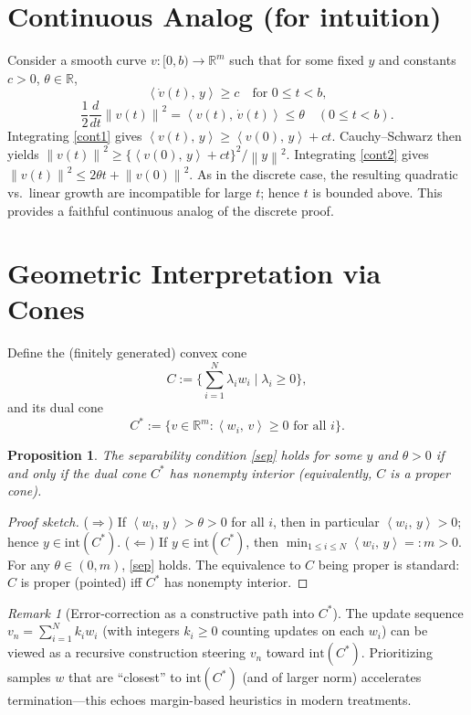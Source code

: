 \documentclass[11pt]{article}
\newtheorem{proposition}{Proposition}
\theoremstyle{remark}
\newtheorem{remark}{Remark}
\newcommand{\inner}[2]{\left\langle #1,\, #2 \right\rangle}
\newcommand{\norm}[1]{\left\lVert #1 \right\rVert}
\newcommand{\R}{\mathbb{R}}
\begin{document}
\section{Continuous Analog (for intuition)}
Consider a smooth curve \(v:[0,b)\to\R^m\) such that for some fixed \(y\) and constants
\(c>0\), \(\theta\in\R\),
\begin{equation}\label{cont1}
  \inner{\dot v(t)}{y}\ge c \quad\text{for } 0\le t<b,
\end{equation}
\begin{equation}\label{cont2}
  \frac12\frac{d}{dt}\norm{v(t)}^2=\inner{v(t)}{\dot v(t)}\le \theta \quad (0\le t<b).
\end{equation}
Integrating \eqref{cont1} gives \(\inner{v(t)}{y}\ge \inner{v(0)}{y}+ct\).
Cauchy--Schwarz then yields
\(\norm{v(t)}^2 \ge \{ \inner{v(0)}{y}+ct\}^2/\norm{y}^2\).
Integrating \eqref{cont2} gives \(\norm{v(t)}^2\le 2\theta t+\norm{v(0)}^2\).
As in the discrete case, the resulting quadratic vs.\ linear growth are incompatible for large \(t\);
hence \(t\) is bounded above. This provides a faithful continuous analog of the discrete proof.

\section{Geometric Interpretation via Cones}
Define the (finitely generated) convex cone
\[
  C:=\Big\{ \sum_{i=1}^N \lambda_i w_i \;\Big|\; \lambda_i\ge0\Big\},
\]
and its dual cone
\[
  C^*:=\{ v\in\R^m : \inner{w_i}{v}\ge0 \text{ for all } i\}.
\]
\begin{proposition}\label{prop:cone}
The separability condition \eqref{sep} holds for some \(y\) and \(\theta>0\)
if and only if the dual cone \(C^*\) has nonempty interior (equivalently, \(C\) is a proper cone).
\end{proposition}
\begin{proof}[Proof sketch]
(\(\Rightarrow\)) If \(\inner{w_i}{y}>\theta>0\) for all \(i\), then in particular
\(\inner{w_i}{y}>0\); hence \(y\in\mathrm{int}(C^*)\).
(\(\Leftarrow\)) If \(y\in\mathrm{int}(C^*)\), then
\(\min_{1\le i\le N}\inner{w_i}{y}=:m>0\). For any \(\theta\in(0,m)\),
\eqref{sep} holds. The equivalence to \(C\) being proper is standard:
\(C\) is proper (pointed) iff \(C^*\) has nonempty interior.
\end{proof}

\begin{remark}[Error-correction as a constructive path into \(C^*\)]
The update sequence \(v_n=\sum_{i=1}^N k_i w_i\) (with integers \(k_i\ge0\) counting updates
on each \(w_i\)) can be viewed as a recursive construction steering \(v_n\) toward
\(\mathrm{int}(C^*)\). Prioritizing samples \(w\) that are ``closest'' to \(\mathrm{int}(C^*)\)
(and of larger norm) accelerates termination—this echoes margin-based heuristics in modern treatments.
\end{remark}
\end{document}
